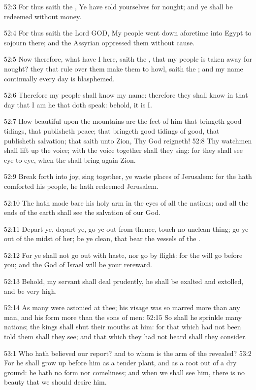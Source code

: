 52:3 For thus saith the \LORD, Ye have sold yourselves for nought; and ye shall be redeemed without money.

52:4 For thus saith the Lord GOD, My people went down aforetime into Egypt to sojourn there; and the Assyrian oppressed them without cause.

52:5 Now therefore, what have I here, saith the \LORD, that my people is taken away for nought? they that rule over them make them to howl, saith the \LORD; and my name continually every day is blasphemed.

52:6 Therefore my people shall know my name: therefore they shall know in that day that I am he that doth speak: behold, it is I.

52:7 How beautiful upon the mountains are the feet of him that bringeth good tidings, that publisheth peace; that bringeth good tidings of good, that publisheth salvation; that saith unto Zion, Thy God reigneth!  52:8 Thy watchmen shall lift up the voice; with the voice together shall they sing: for they shall see eye to eye, when the \LORD shall bring again Zion.

52:9 Break forth into joy, sing together, ye waste places of Jerusalem: for the \LORD hath comforted his people, he hath redeemed Jerusalem.

52:10 The \LORD hath made bare his holy arm in the eyes of all the nations; and all the ends of the earth shall see the salvation of our God.

52:11 Depart ye, depart ye, go ye out from thence, touch no unclean thing; go ye out of the midst of her; be ye clean, that bear the vessels of the \LORD.

52:12 For ye shall not go out with haste, nor go by flight: for the \LORD will go before you; and the God of Israel will be your rereward.

52:13 Behold, my servant shall deal prudently, he shall be exalted and extolled, and be very high.

52:14 As many were astonied at thee; his visage was so marred more than any man, and his form more than the sons of men: 52:15 So shall he sprinkle many nations; the kings shall shut their mouths at him: for that which had not been told them shall they see; and that which they had not heard shall they consider.

53:1 Who hath believed our report? and to whom is the arm of the \LORD revealed?  53:2 For he shall grow up before him as a tender plant, and as a root out of a dry ground: he hath no form nor comeliness; and when we shall see him, there is no beauty that we should desire him.

